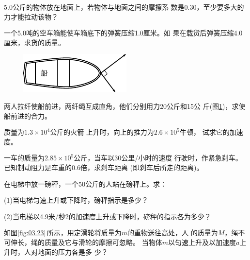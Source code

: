 \begin{exercises}

\exercise 5.0公斤的物体放在地面上，若物体与地面之间的摩擦系
数是0.30，至少要多大的力才能拉动该物？

\exercise 一个5.0吨的空车箱能使车箱底下的弹簧压缩1.0厘米。如
果在载货后弹簧压缩4.0厘米，求货的质量。

\begin{figure}
  \centering
  \includegraphics{figure/fig03.22}
  \caption{}
  \label{fig:03.22}
\end{figure}
\exercise 两人拉纤使船前进，两纤绳互成直角，他们分别用力20公斤和15公
斤(图\ref{fig:03.22})，求使船前进的合力。

\exercise 质量为$ 1.3 \times 10^4 $公斤的火箭
上升时，向上的推力为$ 2.6 \times 10 ^ { 5 } $牛顿，
试求它的加速度。

\exercise 一车的质量为$ 2.85 \times 10 ^ { 5 } $公斤，当车以30公里/小时的速度
行驶时，作紧急刹车。已知制动阻力是车重的0.6倍，求刹车距离
(即刹车后所走的距离)。

\exercise 在电梯中放一磅秤，一个50公斤的人站在磅秤上。求：

(1)当电梯匀速上升或下降时，磅秤指示是多少？

(2)当电梯以4.9米/秒2的加速度上升或下降时，磅秤的指示各为多少？

\exercise 如图\ref{fig:03.23}\,所示，用定滑轮将质量为$ m $的重物送往高处，人
的质量为$ M $，绳不可伸长，绳的质量及它与滑轮的摩擦可忽略。
当物体$ m $以匀速上升及以加速度$ a $上升时，人对地面的压力各是多
少？


\end{exercises}
